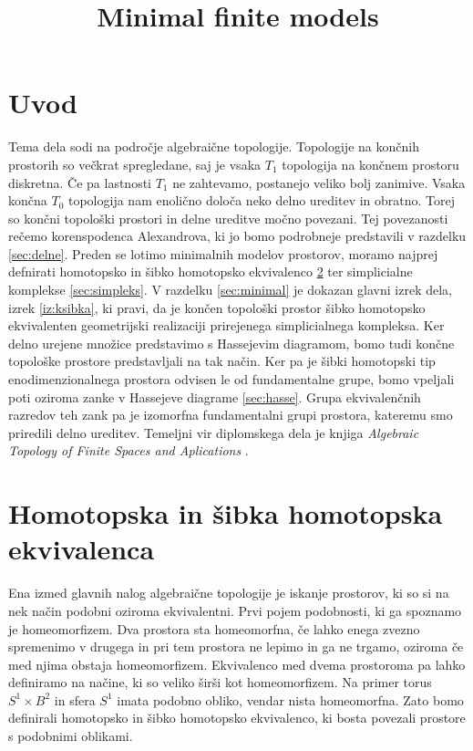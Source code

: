 \documentclass[mat1]{fmfdelo}
\title{Minimal finite models}
\begin{document}
\section{Uvod}

Tema dela sodi na področje algebraične topologije. Topologije na končnih prostorih so večkrat spregledane, saj je vsaka $T_1$ topologija
na končnem prostoru diskretna. Če pa lastnosti $T_1$ ne zahtevamo, postanejo veliko bolj zanimive. Vsaka končna $T_0$ 
topologija nam enolično določa neko delno ureditev in obratno. Torej so končni topološki prostori in delne ureditve močno povezani. Tej povezanosti rečemo korenspodenca Alexandrova, ki jo bomo podrobneje predstavili v razdelku \ref{sec:delne}. Preden se lotimo minimalnih modelov prostorov, moramo najprej 
defnirati homotopsko in šibko homotopsko ekvivalenco \ref{sec:1} ter simplicialne komplekse \ref{sec:simpleks}. V razdelku \ref{sec:minimal} je dokazan glavni izrek dela, izrek \ref{iz:ksibka}, ki pravi, da je končen topološki prostor šibko homotopsko ekvivalenten geometrijski realizaciji 
prirejenega simplicialnega kompleksa. Ker delno urejene množice predstavimo s Hassejevim diagramom, bomo tudi končne topološke prostore predstavljali na tak način. Ker pa je šibki homotopski tip enodimenzionalnega prostora odvisen le od fundamentalne 
grupe, bomo vpeljali poti oziroma zanke v Hassejeve diagrame \ref{sec:hasse}. Grupa ekvivalenčnih razredov teh zank pa je izomorfna fundamentalni grupi prostora, kateremu smo priredili delno ureditev. Temeljni vir diplomskega dela je knjiga 
\textit{Algebraic Topology of Finite Spaces and Aplications} \cite{barmak}.

\section{Homotopska in šibka homotopska ekvivalenca}\label{sec:1}

Ena izmed glavnih nalog algebraične topologije je iskanje prostorov, ki so si 
na nek način podobni oziroma ekvivalentni. Prvi pojem podobnosti, ki ga spoznamo
je homeomorfizem. Dva prostora sta homeomorfna, če lahko enega zvezno spremenimo v drugega in pri tem prostora ne lepimo in ga ne trgamo, oziroma če med njima obstaja homeomorfizem. Ekvivalenco med dvema 
prostoroma pa lahko definiramo na načine, ki so veliko širši kot homeomorfizem.
Na primer torus $S^1\times B^2$ in sfera $S^1$ imata podobno obliko, vendar nista
 homeomorfna. Zato bomo definirali homotopsko in šibko homotopsko ekvivalenco, ki bosta povezali prostore s podobnimi oblikami.
\end{document}
